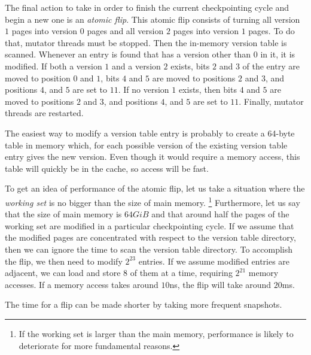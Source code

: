 The final action to take in order to finish the current checkpointing
cycle and begin a new one is an \emph{atomic flip}.  This atomic flip
consists of turning all version $1$ pages into version $0$ pages and
all version $2$ pages into version $1$ pages.  To do that, mutator
threads must be stopped.  Then the in-memory version table is scanned.
Whenever an entry is found that has a version other than $0$ in it, it
is modified.  If both a version $1$ and a version $2$ exists, bits $2$
and $3$ of the entry are moved to position $0$ and $1$, bits $4$ and
$5$ are moved to positions $2$ and $3$, and positions $4$, and $5$ are
set to $11$.  If no version $1$ exists, then bits $4$ and $5$ are
moved to positions $2$ and $3$, and positions $4$, and $5$ are set to
$11$.  Finally, mutator threads are restarted.

The easiest way to modify a version table entry is probably to create
a 64-byte table in memory which, for each possible version of the
existing version table entry gives the new version.  Even though it
would require a memory access, this table will quickly be in the
cache, so access will be fast.  

To get an idea of performance of the atomic flip, let us take a
situation where the \emph{working set} is no bigger than the size of
main memory.%
\footnote{If the working set is larger than the main memory,
  performance is likely to deteriorate for more fundamental reasons.}
Furthermore, let us say that the size of main memory is $64GiB$ and
that around half the pages of the working set are modified in a
particular checkpointing cycle.  If we assume that the modified pages
are concentrated with respect to the version table directory, then we
can ignore the time to scan the version table directory.  To
accomplish the flip, we then need to modify $2^{23}$ entries.  If we
assume modified entries are adjacent, we can load and store $8$ of
them at a time, requiring $2^{21}$ memory accesses.  If a memory
access takes around $10$ns, the flip will take around $20$ms. 

The time for a flip can be made shorter by taking more frequent
snapshots. 

